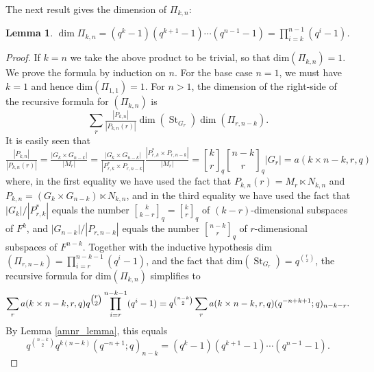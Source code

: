 \documentclass[reqno]{amsart}
\newtheorem{lemma}[theorem]{Lemma}
\theoremstyle{definition}
\theoremstyle{remark}
\numberwithin{equation}{section}
\newcommand{\stirling}[2]{\genfrac{[}{]}{0pt}{1}{#1}{#2}}
\DeclareMathOperator{\St}{St}
\begin{document}
The next result gives the dimension of $\Pi_{k,n}$:
\begin{lemma} \label{dim_Pi_k_n}
    $\dim \Pi_{k,n}= (q^k-1)(q^{k+1}-1) \cdots (q^{n-1}-1)=\prod_{i=k}^{n-1}(q^i-1)$.
\end{lemma}
\begin{proof}
   If $k=n$ we take the above product to be trivial, so that dim$(\Pi_{k,n})=1$. We prove the formula by induction on $n$. For the base case $n=1$, we must have $k=1$ and hence  dim$(\Pi_{1,1})=1$. For $n>1$, the dimension of the right-side of the recursive formula for $(\Pi_{k,n})$ is  
   \[\sum_r \tfrac{|P_{k,n}|}{|P_{k,n}(r)|} \dim(\St_{G_r}) \dim(\Pi_{r,n-k}).\]
   It is easily seen that 
   \[        \tfrac{|P_{k,n}|}{|P_{k,n}(r)|}=\tfrac{|G_k \times G_{n-k}|}{|M_r|}=\tfrac{|G_k \times G_{n-k}|}{|P^*_{r,k} \times P_{r,n-k}|} \tfrac{|P^*_{r,k} \times P_{r,n-k}|}{|M_r|}
=\stirling{k}{r}_q \stirling{n-k}{r}_q |G_r|=a(k \times n-k,r,q)\]
where, in the first equality we have used the fact that 
   $P_{k,n}(r)=M_{r} \ltimes N_{k,n}$ and $P_{k,n}=(G_k \times G_{n-k})  \ltimes N_{k,n}$, and in the third equality we have used the fact that $|G_k|/|P^*_{r,k}|$ equals the number $\stirling{k}{k-r}_q=\stirling{k}{r}_q$ of $(k-r)$-dimensional subspaces of $F^k$, and $|G_{n-k}|/|P_{r,n-k}|$ equals the number $\stirling{n-k}{r}_q$ of $r$-dimensional subspaces of $F^{n-k}$.
Together with the inductive hypothesis dim$(\Pi_{r,n-k})=\prod_{i=r}^{n-k-1}(q^i-1)$, and the fact that dim$(\St_{G_r})=q^{\binom{r}{2}}$, the recursive formula for dim$(\Pi_{k,n})$    
 simplifies to 
\[\sum_r  a(k \times n-k,r,q)  q^{\tbinom{r}{2}} \prod_{i=r}^{n-k-1}(q^i-1)= q^{\binom{n-k}{2}} \sum_r  a(k \times n-k,r,q) (q^{-n+k+1};q)_{n-k-r}.  \]
By Lemma \ref{amnr_lemma}, this  equals
\[ q^{\binom{n-k}{2}} q^{k(n-k)} (q^{-n+1};q)_{n-k}=(q^k-1)(q^{k+1}-1)\cdots (q^{n-1}-1).\]
\end{proof}
\end{document}
